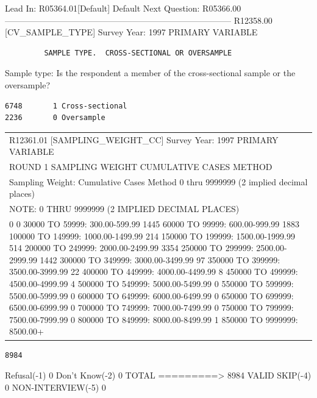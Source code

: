 \documentclass[
  man,floatsintext]{apa6}
\begin{document}
Lead In: R05364.01{[}Default{]}
Default Next Question: R05366.00
--------------------------------------------------------------------------------
R12358.00 {[}CV\_SAMPLE\_TYPE{]} Survey Year: 1997
PRIMARY VARIABLE

\begin{verbatim}
         SAMPLE TYPE.  CROSS-SECTIONAL OR OVERSAMPLE
\end{verbatim}

Sample type: Is the respondent a member of the cross-sectional sample or the
oversample?

\begin{verbatim}
6748       1 Cross-sectional
2236       0 Oversample
\end{verbatim}

\begin{longtable}[]{@{}
  >{\centering\arraybackslash}p{}@{}}
\toprule\noalign{}
\begin{minipage}[b]{\linewidth}\centering
8984
\end{minipage} \\
\midrule\noalign{}
\endhead
\bottomrule\noalign{}
\endlastfoot
R12361.01 {[}SAMPLING\_WEIGHT\_CC{]} Survey Year: 1997
PRIMARY VARIABLE \\
ROUND 1 SAMPLING WEIGHT CUMULATIVE CASES METHOD \\
Sampling Weight: Cumulative Cases Method 0 thru 9999999 (2 implied decimal
places) \\
NOTE: 0 THRU 9999999 (2 IMPLIED DECIMAL PLACES) \\
0 0
0 30000 TO 59999: 300.00-599.99
1445 60000 TO 99999: 600.00-999.99
1883 100000 TO 149999: 1000.00-1499.99
214 150000 TO 199999: 1500.00-1999.99
514 200000 TO 249999: 2000.00-2499.99
3354 250000 TO 299999: 2500.00-2999.99
1442 300000 TO 349999: 3000.00-3499.99
97 350000 TO 399999: 3500.00-3999.99
22 400000 TO 449999: 4000.00-4499.99
8 450000 TO 499999: 4500.00-4999.99
4 500000 TO 549999: 5000.00-5499.99
0 550000 TO 599999: 5500.00-5999.99
0 600000 TO 649999: 6000.00-6499.99
0 650000 TO 699999: 6500.00-6999.99
0 700000 TO 749999: 7000.00-7499.99
0 750000 TO 799999: 7500.00-7999.99
0 800000 TO 849999: 8000.00-8499.99
1 850000 TO 9999999: 8500.00+ \\
\end{longtable}

\begin{verbatim}
8984
\end{verbatim}

Refusal(-1) 0
Don't Know(-2) 0
TOTAL =========\textgreater{} 8984 VALID SKIP(-4) 0 NON-INTERVIEW(-5) 0
\end{document}
